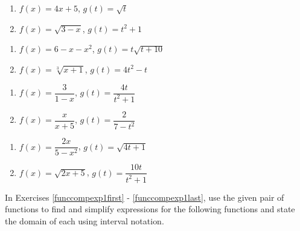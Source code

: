\begin{multicols}{2}
\begin{enumerate}
\setcounter{enumi}{\value{HW}}

\item  $f(x) = 4x+5$, $g(t) = \sqrt{t}$
\item  $f(x) = \sqrt{3-x}$, $g(t) = t^2+1$

\setcounter{HW}{\value{enumi}}
\end{enumerate}
\end{multicols}

\begin{multicols}{2}
\begin{enumerate}
\setcounter{enumi}{\value{HW}}

\item  $f(x) = 6-x-x^2$, $g(t) = t\sqrt{t+10}$
\item  $f(x) = \sqrt[3]{x+1}$, $g(t) = 4t^2-t$

\setcounter{HW}{\value{enumi}}
\end{enumerate}
\end{multicols}

\begin{multicols}{2}
\begin{enumerate}
\setcounter{enumi}{\value{HW}}

\item  $f(x) = \dfrac{3}{1-x}$, $g(t) = \dfrac{4t}{t^2+1}$
\item  $f(x) = \dfrac{x}{x+5}$, $g(t) = \dfrac{2}{7-t^2}$


\setcounter{HW}{\value{enumi}}
\end{enumerate}
\end{multicols}

\begin{multicols}{2}
\begin{enumerate}
\setcounter{enumi}{\value{HW}}

\item  $f(x) = \dfrac{2x}{5-x^2}$, $g(t) = \sqrt{4t+1}$
\item  $f(x) =\sqrt{2x+5}$, $g(t) = \dfrac{10t}{t^2+1}$ \label{funccompeval1last}

\setcounter{HW}{\value{enumi}}
\end{enumerate}
\end{multicols}


In Exercises \ref{funccompexp1first} - \ref{funccompexp1last}, use the given pair of functions to find and simplify expressions for the following functions and state the domain of each using interval notation.

